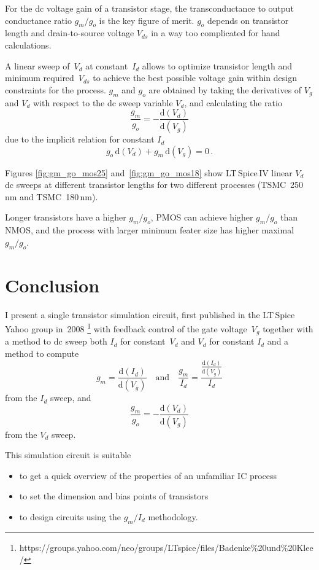 \documentclass[journal]{IEEEtran}
\def\le{\left}
\def\ri{\right}
\begin{document}
For the dc voltage gain of a transistor stage, 
the transconductance to output conductance ratio $g_m/g_o$ is the key figure of merit.
$g_o$ depends on transistor length and drain-to-source voltage $V_{d{s}}$ 
in a way too complicated for hand calculations. 

A linear sweep of~$V_d$ at constant~$I_d$ allows to optimize transistor length 
and minimum required~$V_{d{s}}$ to achieve the best possible voltage gain
within design constraints for the process. 
$g_m$ and $g_o$ are obtained by taking the derivatives of $V_g$ and $V_d$ with respect to the dc sweep variable $V_d$, and calculating the ratio
\begin{equation}
\frac{g_m}{g_o} = -\frac{\mathrm{d}\le(V_d\ri)}{\mathrm{d}\le(V_g\ri)}
\end{equation}
due to the implicit relation for constant $I_d$
\begin{equation}
g_o\,\mathrm{d}\le(V_d\ri) + g_m\,\mathrm{d}\le(V_g\ri) = 0\,.
\end{equation}

Figures \ref{fig:gm_go_mos25} and~\ref{fig:gm_go_mos18}
show LT\,Spice\,IV linear $V_d$ dc sweeps at different transistor lengths for two different processes 
(TSMC~250\,nm and TSMC~180\,nm).

Longer transistors have a higher $g_m/g_o$, PMOS can achieve higher $g_m/g_o$ than NMOS,
and the process with larger minimum feater size has higher maximal $g_m/g_o$.

\section{Conclusion}
I present a single transistor simulation circuit, 
first published in the LT\,Spice Yahoo group in~2008%
\footnote{https://groups.yahoo.com/neo/groups/LTspice/files/Badenke\%20und\%20Klee/} 
with feedback control of the gate voltage~$V_g$
together with a method to dc sweep both 
$I_d$ for constant~$V_d$ and $V_d$ for constant $I_d$
and a method to compute 
\begin{equation}
g_m = \frac{\mathrm{d}\le(I_d\ri)}{\mathrm{d}\le(V_g\ri)} \quad\mathrm{and}\quad
\frac{g_m}{I_d} = \frac{\frac{\mathrm{d}\le(I_d\ri)}{\mathrm{d}\le(V_g\ri)}}{I_d}
\end{equation}
from the $I_d$ sweep, and
\begin{equation}
\frac{g_m}{g_o} = -\frac{\mathrm{d}\le(V_d\ri)}{\mathrm{d}\le(V_g\ri)}
\end{equation}
from the $V_d$ sweep. 

This simulation circuit is suitable
\begin{itemize}
\item to get a quick overview of the properties of an unfamiliar IC process
\item to set the dimension and bias points of transistors 
\item to design circuits using the $g_m/I_d$ methodology.
\end{itemize}
\end{document}

